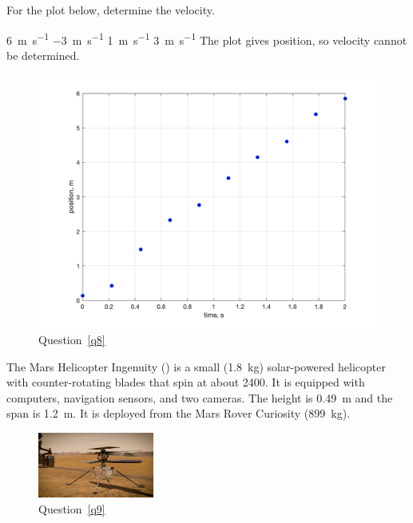 \documentclass[exam,addpoints, noanswers]{exam}
\begin{document}
\begin{questions}
\clearpage
\question[1]\label{q8} For the plot below, determine the velocity.  
\begin{choices}
\choice \SI{6}{\meter\per\second}
\choice \SI{-3}{\meter\per\second}
\choice \SI{1}{\meter\per\second}
\CorrectChoice \SI{3}{\meter\per\second}
\choice The plot gives position, so velocity cannot be determined. 
\end{choices}
\setcounter{figure}{7}
\begin{figure}[h]
\begin{center}
\includegraphics[width=5in]{Q3Aq8.png}
\end{center}
\caption{Question~\ref{q8}}
\label{fig:q8}
\end{figure}




\clearpage
\question\label{q9} The Mars Helicopter Ingenuity () is a small (\SI{1.8}{\kilo\gram}) solar-powered helicopter with counter-rotating blades that spin at about \SI{2400}{\rpm}. It is equipped with computers, navigation sensors, and two cameras. The height is \SI{0.49}{\meter} and the span is \SI{1.2}{\meter}. It is deployed from the Mars Rover Curiosity (\SI{899}{\kilo\gram}). 
\begin{figure}[h]
\begin{center}
\includegraphics[width=1.5in]{ingenuity.jpg}
\end{center}
\caption{Question~\ref{q9}}
\label{fig:q9}
\end{figure}
\begin{parts}

\end{parts}
\end{questions}
\end{document}

